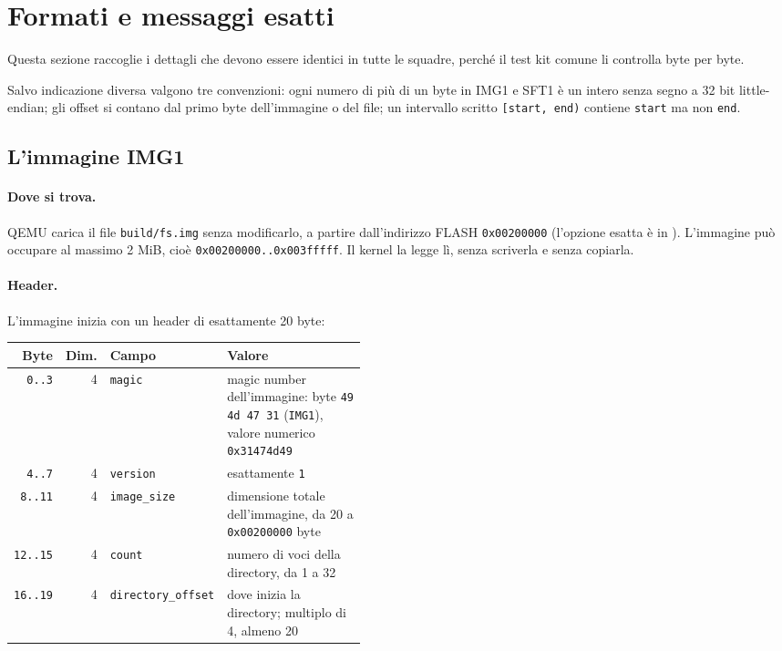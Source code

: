 \section{Formati e messaggi esatti}

Questa sezione raccoglie i dettagli che devono essere identici in tutte le squadre, perché il test kit comune li controlla byte per byte.

Salvo indicazione diversa valgono tre convenzioni: ogni numero di più di un byte in IMG1 e SFT1 è un intero senza segno a 32 bit little-endian; gli offset si contano dal primo byte dell'immagine o del file; un intervallo scritto \texttt{[start, end)} contiene \texttt{start} ma non \texttt{end}.

\subsection{L'immagine IMG1}

\begin{sloppypar}
\paragraph{Dove si trova.} QEMU carica il file \texttt{build/fs.img} senza modificarlo, a partire dall'indirizzo FLASH \texttt{0x00200000} (l'opzione esatta è in ). L'immagine può occupare al massimo 2 MiB, cioè \texttt{0x00200000..0x003fffff}. Il kernel la legge lì, senza scriverla e senza copiarla.
\end{sloppypar}

\paragraph{Header.} L'immagine inizia con un header di esattamente 20 byte:

\begin{center}
\small
\begin{tabular}{|r|r|l|p{0.45\linewidth}|}
\hline
Byte & Dim. & Campo & \raggedright Valore \tabularnewline
\hline\hline
\texttt{0..3} & 4 & \texttt{magic} & \raggedright magic number dell'immagine: byte \texttt{49 4d 47 31} (\texttt{IMG1}), valore numerico \texttt{0x31474d49} \tabularnewline
\hline
\texttt{4..7} & 4 & \texttt{version} & \raggedright esattamente \texttt{1} \tabularnewline
\hline
\texttt{8..11} & 4 & \texttt{image\_size} & \raggedright dimensione totale dell'immagine, da 20 a \texttt{0x00200000} byte \tabularnewline
\hline
\texttt{12..15} & 4 & \texttt{count} & \raggedright numero di voci della directory, da 1 a 32 \tabularnewline
\hline
\texttt{16..19} & 4 & \texttt{directory\_offset} & \raggedright dove inizia la directory; multiplo di 4, almeno 20 \tabularnewline
\hline
\end{tabular}
\end{center}

